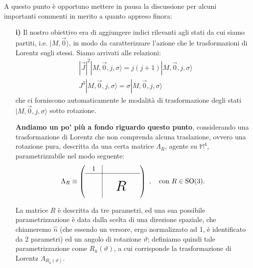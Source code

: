 \documentclass[../main.tex]{subfiles}
\begin{document}
A questo punto è opportuno mettere in pausa la discussione per alcuni importanti commenti in merito a quanto appreso finora:
\begin{enumerate}
    \item[\textbf{i)}] Il nostro obiettivo era di aggiungere indici rilevanti agli stati da cui siamo partiti, i.e. \(|M, \Vec{0}\rangle\), in modo da caratterizzare l'azione che le trasformazioni di Lorentz sugli stessi. Siamo arrivati alle relazioni:
    \[
    \begin{aligned}
        &|\Vec{J}|^2|M, \Vec{0}, j, \sigma\rangle = j(j+1)|M, \Vec{0}, j, \sigma\rangle\\
        &J^3|M, \Vec{0}, j, \sigma\rangle = \sigma|M, \Vec{0}, j, \sigma\rangle
    \end{aligned}
    \]
    che ci forniscono automaticamente le modalità di trasformazione degli stati \(|M, \Vec{0}, j, \sigma\rangle\) sotto rotazione. 

    \textbf{Andiamo un po' più a fondo riguardo questo punto}, considerando una trasformazione di Lorentz che non comprenda alcuna traslazione, ovvero una rotazione pura, descritta da una certa matrice \(\Lambda_R\), agente su \(\mathbb M^4\), parametrizzabile nel modo seguente:
    \[
    \Lambda_R \equiv
    \begin{pmatrix} 
    \begin{array}{c|c}
        1 & \begin{array}{ccc} \phantom 0 & \phantom 0 & \phantom 0 \end{array} \\
        \hline
        \begin{array}{c} \phantom 0 \\ \phantom 0 \\ \phantom 0 \end{array} & \begin{array}{c} \vcenter{\hbox{\hspace*{7pt}\huge$R$\hspace*{7pt}}} \end{array}
    \end{array}
    \end{pmatrix}~,\quad \text{con } R\in \text{SO}(3).
    \]

    La matrice $R$ è descritta da tre parametri, ed una sua possibile parametrizzazione è data dalla scelta di una direzione spaziale, che chiameremo $\hat{n}$ (che essendo un versore, ergo normalizzato ad 1, è identificato da 2 parametri) ed un angolo di rotazione $\vartheta$; definiamo quindi tale parametrizzazione come \(R_{\hat{n}}(\vartheta)\), a cui corrisponde la trasformazione di Lorentz \(\Lambda_{R_{\hat{n}}(\vartheta)}\).


\end{enumerate}
\end{document}
